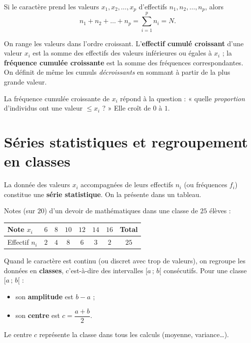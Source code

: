 \begin{propriete}
Si le caractère prend les valeurs $x_1,x_2,\dots,x_p$ d'effectifs $n_1,n_2,\dots,n_p$,
alors
\[ n_1+n_2+\dots+n_p = \sum_{i=1}^{p} n_i = N. \]
\end{propriete}

\begin{definition}
On range les valeurs dans l'ordre croissant. L'\textbf{effectif cumulé croissant}
d'une valeur $x_i$ est la somme des effectifs des valeurs inférieures ou égales à
$x_i$ ; la \textbf{fréquence cumulée croissante} est la somme des fréquences
correspondantes. On définit de même les cumuls \emph{décroissants} en sommant à
partir de la plus grande valeur.
\end{definition}

\begin{remarque}
La fréquence cumulée croissante de $x_i$ répond à la question : « quelle
\emph{proportion} d'individus ont une valeur $\le x_i$ ? » Elle croît de $0$ à $1$.
\end{remarque}

\section{Séries statistiques et regroupement en classes}

\begin{definition}
La donnée des valeurs $x_i$ accompagnées de leurs effectifs $n_i$ (ou fréquences
$f_i$) constitue une \textbf{série statistique}. On la présente dans un tableau.
\end{definition}

\begin{exemple}
Notes (sur $20$) d'un devoir de mathématiques dans une classe de $25$ élèves :
\begin{center}\renewcommand{\arraystretch}{1.25}
\begin{tabular}{@{}l c c c c c c c@{}}
\toprule
Note $x_i$ & $6$ & $8$ & $10$ & $12$ & $14$ & $16$ & Total \\
\midrule
Effectif $n_i$ & $2$ & $4$ & $8$ & $6$ & $3$ & $2$ & $25$ \\
\bottomrule
\end{tabular}
\end{center}
\end{exemple}

\begin{definition}
Quand le caractère est continu (ou discret avec trop de valeurs), on regroupe les
données en \textbf{classes}, c'est-à-dire des intervalles $[a\,;\,b[$ consécutifs.
Pour une classe $[a\,;\,b[$ :
\begin{itemize}
  \item son \textbf{amplitude} est $b-a$ ;
  \item son \textbf{centre} est $c=\dfrac{a+b}{2}$.
\end{itemize}
Le centre $c$ représente la classe dans tous les calculs (moyenne, variance\dots).
\end{definition}

